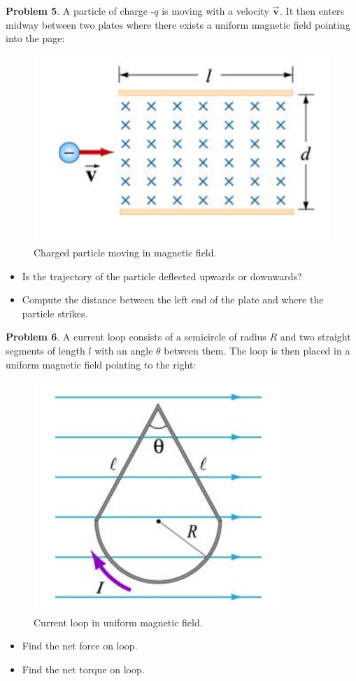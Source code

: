 \documentclass[11pt, letterpaper]{article}
\theoremstyle{definition}
\theoremstyle{remark}
\newcommand{\bv}[2][]{\bm{\vec{#2}_{#1}}}
\begin{document}
\textbf{Problem 5}. A particle of charge -$q$ is moving with a velocity $\bv{v}$. It then enters midway between two plates where there exists a uniform magnetic field pointing into the page:
\begin{figure}[h!]
	\centering
	\includegraphics[scale=0.7]{particle-traj}
	\caption{Charged particle moving in magnetic field.}
	\label{fig:particle-traj}
\end{figure}
\begin{itemize}
	\item Is the trajectory of the particle deflected upwards or downwards?
	\item Compute the distance between the left end of the plate and where the particle strikes.
\end{itemize}
\newpage

\textbf{Problem 6}. A current loop consists of a semicircle of radius $R$ and two straight segments of length $l$ with an angle $\theta$ between them. The loop is then placed in a uniform magnetic field pointing to the right:
\begin{figure}[h!]
	\centering
	\includegraphics[scale=0.7]{weird-loop}
	\caption{Current loop in uniform magnetic field.}
	\label{fig:weird-loop}
\end{figure}
\begin{itemize}
	\item Find the net force on loop.
	\item Find the net torque on loop.
\end{itemize}
\end{document}
